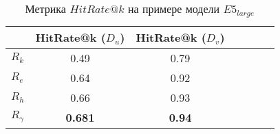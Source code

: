 \begin{table}[ht]
    \centering
    \begin{tabular}{lcccccc}
        \hline
        & \textbf{HitRate@k (\(D_u\))} & \textbf{HitRate@k (\(D_v\))} \\
       \hline
       \(R_k\)      &  0.49&  0.79 \\
       \(R_e\)      &  0.64&  0.92\\
       \(R_h\)      &  0.66&  0.93\\
       \(R_{\gamma}\) &  \textbf{0.681}&  \textbf{0.94}\\
       \hline
       \end{tabular}
    \caption{Метрика $HitRate@k$ на примере модели $E5_{large}$ \cite{e5}}
    \label{tab:hitrate-large}
\end{table}